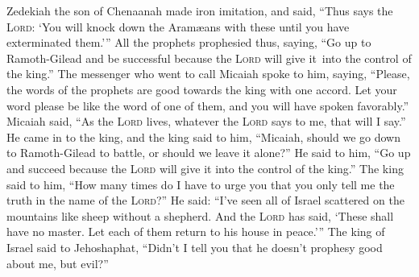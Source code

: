 \begin{inparaenum}
     Zedekiah the son of Chenaanah made iron imitation, and said, ``Thus says the \textsc{Lord}: `You will knock down the Aram\ae{}ans with these until you have exterminated them.'\thinspace''%
     All the prophets prophesied thus, saying, ``Go up to Ramoth-Gilead and be successful because the \textsc{Lord} will give it\understood\ into the control of the king.''%
     The messenger who went to call Micaiah spoke to him, saying, ``Please, the words of the prophets are good towards the king with one accord. Let your word please be like the word of one of them, and you will have spoken favorably.''%
     Micaiah said, ``As the \textsc{Lord} lives, whatever the \textsc{Lord} says to me, that will I say.''%
     He came in to the king, and the king said to him, ``Micaiah, should we go down to Ramoth-Gilead to battle, or should we leave it alone?'' He said to him, ``Go up and succeed because the \textsc{Lord} will give it into the control of the king.''%
     The king said to him, ``How many times do I have to urge you that you only tell me the truth in the name of the \textsc{Lord}?''%
     He said: ``I've seen all of Israel scattered on the mountains like sheep without a shepherd. And the \textsc{Lord} has said, `These shall have no master. Let each of them return to his house in peace.'\thinspace''%
     The king of Israel said to Jehoshaphat, ``Didn't I tell you that he doesn't prophesy good about me, but evil?''%

\end{inparaenum}
